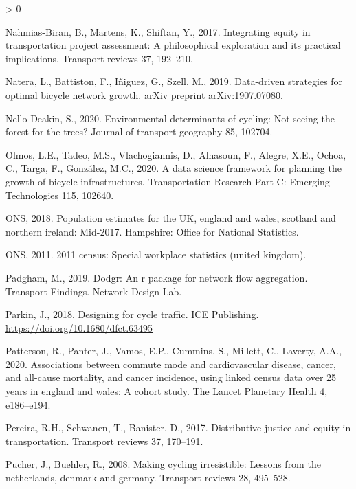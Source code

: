 \documentclass[
]{article}
\newlength{\cslhangindent}
\newenvironment{CSLReferences}[2] %
 {%
  \setlength{\parindent}{0pt}
  \ifodd #1 \everypar{\setlength{\hangindent}{\cslhangindent}}\ignorespaces\fi
  \ifnum #2 > 0
  \setlength{\parskip}{#2\baselineskip}
  \fi
 }%
 {}
\begin{document}
\begin{CSLReferences}{1}{0}
\leavevmode\hypertarget{ref-nahmias2017integrating}{}%
Nahmias-Biran, B., Martens, K., Shiftan, Y., 2017. Integrating equity in transportation project assessment: A philosophical exploration and its practical implications. Transport reviews 37, 192--210.

\leavevmode\hypertarget{ref-natera2019data}{}%
Natera, L., Battiston, F., Iñiguez, G., Szell, M., 2019. Data-driven strategies for optimal bicycle network growth. arXiv preprint arXiv:1907.07080.

\leavevmode\hypertarget{ref-nello2020environmental}{}%
Nello-Deakin, S., 2020. Environmental determinants of cycling: Not seeing the forest for the trees? Journal of transport geography 85, 102704.

\leavevmode\hypertarget{ref-olmos2020data}{}%
Olmos, L.E., Tadeo, M.S., Vlachogiannis, D., Alhasoun, F., Alegre, X.E., Ochoa, C., Targa, F., González, M.C., 2020. A data science framework for planning the growth of bicycle infrastructures. Transportation Research Part C: Emerging Technologies 115, 102640.

\leavevmode\hypertarget{ref-ofn2018population}{}%
ONS, 2018. Population estimates for the UK, england and wales, scotland and northern ireland: Mid-2017. Hampshire: Office for National Statistics.

\leavevmode\hypertarget{ref-ONS2011flowdata}{}%
ONS, 2011. 2011 census: Special workplace statistics (united kingdom).

\leavevmode\hypertarget{ref-padgham2019dodgr}{}%
Padgham, M., 2019. Dodgr: An r package for network flow aggregation. Transport Findings. Network Design Lab.

\leavevmode\hypertarget{ref-parkin2018designing}{}%
Parkin, J., 2018. Designing for cycle traffic. ICE Publishing. \url{https://doi.org/10.1680/dfct.63495}

\leavevmode\hypertarget{ref-patterson2020associations}{}%
Patterson, R., Panter, J., Vamos, E.P., Cummins, S., Millett, C., Laverty, A.A., 2020. Associations between commute mode and cardiovascular disease, cancer, and all-cause mortality, and cancer incidence, using linked census data over 25 years in england and wales: A cohort study. The Lancet Planetary Health 4, e186--e194.

\leavevmode\hypertarget{ref-pereira2017distributive}{}%
Pereira, R.H., Schwanen, T., Banister, D., 2017. Distributive justice and equity in transportation. Transport reviews 37, 170--191.

\leavevmode\hypertarget{ref-pucher2008making}{}%
Pucher, J., Buehler, R., 2008. Making cycling irresistible: Lessons from the netherlands, denmark and germany. Transport reviews 28, 495--528.


\end{CSLReferences}
\end{document}
